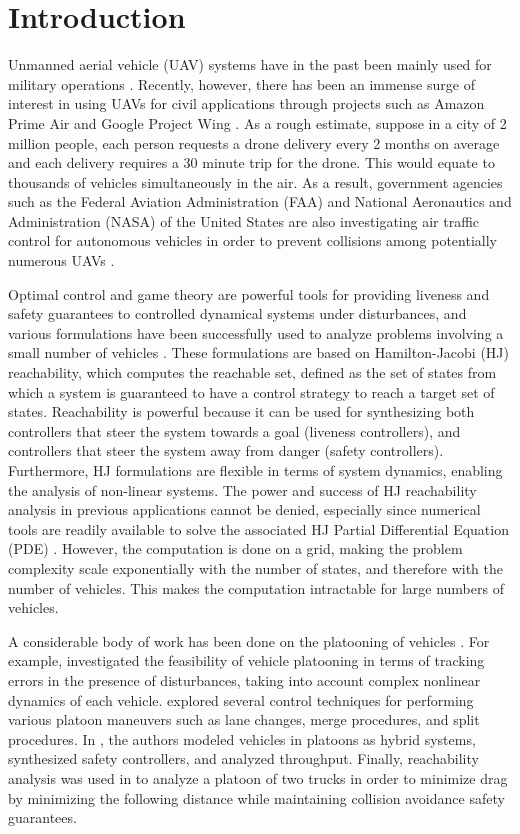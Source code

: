 \section{Introduction}
Unmanned aerial vehicle (UAV) systems have in the past been mainly used for military operations \cite{Tice91}. Recently, however, there has been an immense surge of interest in using UAVs for civil applications through projects such as Amazon Prime Air and Google Project Wing \cite{PrimeAir,ProjectWing,Debusk10}. As a rough estimate, suppose in a city of 2 million people, each person requests a drone delivery every 2 months on average and each delivery requires a 30 minute trip for the drone. This would equate to thousands of vehicles simultaneously in the air. As a result, government agencies such as the Federal Aviation Administration (FAA) and National Aeronautics and Administration (NASA) of the United States are also investigating air traffic control for autonomous vehicles in order to prevent collisions among potentially numerous UAVs \cite{FAA13}. 

Optimal control and game theory are powerful tools for providing liveness and safety guarantees to controlled dynamical systems under disturbances, and various formulations \cite{Bokanowski10,Mitchell05,Barron89} have been successfully used to analyze problems involving a small number of vehicles \cite{Fisac15,Chen14,Ding08}. These formulations are based on Hamilton-Jacobi (HJ) reachability, which computes the reachable set, defined as the set of states from which a system is guaranteed to have a control strategy to reach a target set of states. Reachability is powerful because it can be used for synthesizing both controllers that steer the system towards a goal (liveness controllers), and controllers that steer the system away from danger (safety controllers). Furthermore, HJ formulations are flexible in terms of system dynamics, enabling the analysis of non-linear systems. The power and success of HJ reachability analysis in previous applications cannot be denied, especially since numerical tools are readily available to solve the associated HJ Partial Differential Equation (PDE) \cite{LSToolbox,Osher02,Sethian96}. However, the computation is done on a grid, making the problem complexity scale exponentially with the number of states, and therefore with the number of vehicles. This makes the computation intractable for large numbers of vehicles. 

A considerable body of work has been done on the platooning of vehicles \cite{Kavathekar11}. For example, \cite{McMahon90} investigated the feasibility of vehicle platooning in terms of tracking errors in the presence of disturbances, taking into account complex nonlinear dynamics of each vehicle.  \cite{Hedrick92} explored several control techniques for performing various platoon maneuvers such as lane changes, merge procedures, and split procedures. In \cite{Lygeros98}, the authors modeled vehicles in platoons as hybrid systems, synthesized safety controllers, and analyzed throughput. Finally, reachability analysis was used in \cite{Alam11} to analyze a platoon of two trucks in order to minimize drag by minimizing the following distance while maintaining collision avoidance safety guarantees.

